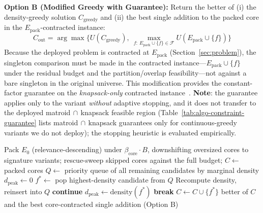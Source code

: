 \documentclass[11pt, a4paper]{article}
\begin{document}
\textbf{Option B (Modified Greedy with Guarantee):} Return the better of (i) the density-greedy solution $C_{\text{greedy}}$ and (ii) the best single addition to the packed core in the $E_{\mathrm{pack}}$-contracted instance:
\[
C_{\text{out}} = \arg\max\{U(C_{\text{greedy}}),\ \max_{f:\ E_{\mathrm{pack}} \cup \{f\} \in \mathcal{F}} U(E_{\mathrm{pack}} \cup \{f\})\}
\]
Because the deployed problem is contracted at $E_{\mathrm{pack}}$ (Section~\ref{sec:problem}), the singleton comparison must be made in the contracted instance---$E_{\mathrm{pack}} \cup \{f\}$ under the residual budget and the partition/overlap feasibility---not against a bare singleton in the original universe. This modification provides the constant-factor guarantee on the \emph{knapsack-only} contracted instance~\cite{khuller1999budgeted,krause2005note}. \textbf{Note}: the guarantee applies only to the variant \emph{without} adaptive stopping, and it does not transfer to the deployed matroid$\,\cap\,$knapsack feasible region (Table~\ref{tab:algo-constraint-guarantee} lists matroid$\,\cap\,$knapsack guarantees only for continuous-greedy variants we do not deploy); the stopping heuristic is evaluated empirically.

\begin{algorithm}[t]
\caption{Lazy Greedy Context Selection (Heuristic Version)}
\begin{algorithmic}[1]
\State Pack $E_0$ (relevance-descending) under $\beta_{\mathrm{core}} \cdot B$, downshifting oversized cores to signature variants; rescue-sweep skipped cores against the full budget; $C \gets$ packed cores
\State $Q \gets$ priority queue of all remaining candidates by marginal density
\State $d_{\mathrm{peak}} \gets 0$
    \State $f^* \gets$ pop highest-density candidate from $Q$
        \State Recompute density, reinsert into $Q$
        \State \textbf{continue}
    \EndIf
        \State $d_{\mathrm{peak}} \gets \text{density}(f^*)$
        \State \textbf{break} 
    \EndIf
        \State $C \gets C \cup \{f^*\}$
    \EndIf
\EndWhile
\State \Return better of $C$ and the best core-contracted single addition (Option B)
\end{algorithmic}
\end{algorithm}
\end{document}

